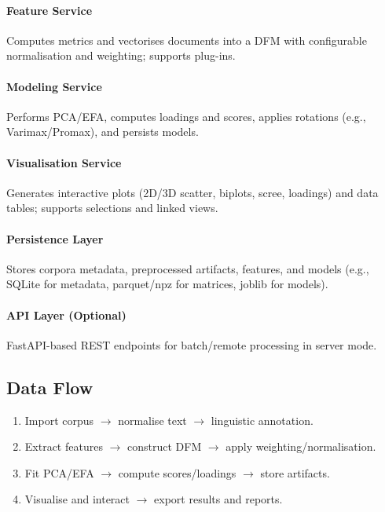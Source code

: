 \paragraph{Feature Service}
Computes metrics and vectorises documents into a DFM with configurable normalisation and weighting; supports plug-ins.

\paragraph{Modeling Service}
Performs PCA/EFA, computes loadings and scores, applies rotations (e.g., Varimax/Promax), and persists models.

\paragraph{Visualisation Service}
Generates interactive plots (2D/3D scatter, biplots, scree, loadings) and data tables; supports selections and linked views.

\paragraph{Persistence Layer}
Stores corpora metadata, preprocessed artifacts, features, and models (e.g., SQLite for metadata, parquet/npz for matrices, joblib for models).

\paragraph{API Layer (Optional)}
FastAPI-based REST endpoints for batch/remote processing in server mode.

\subsection{Data Flow}
\begin{enumerate}
    \item Import corpus $\rightarrow$ normalise text $\rightarrow$ linguistic annotation.
    \item Extract features $\rightarrow$ construct DFM $\rightarrow$ apply weighting/normalisation.
    \item Fit PCA/EFA $\rightarrow$ compute scores/loadings $\rightarrow$ store artifacts.
    \item Visualise and interact $\rightarrow$ export results and reports.
\end{enumerate}


